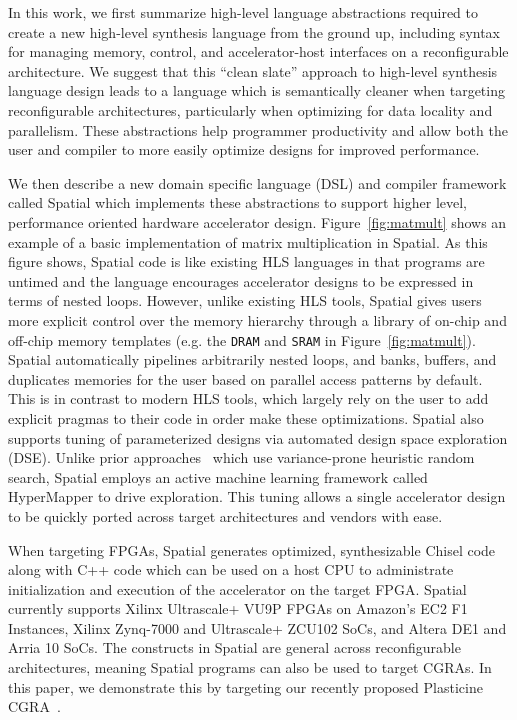 In this work, we first summarize high-level language abstractions required to create a new high-level synthesis language from the ground up, including syntax for managing memory, control, and accelerator-host interfaces on a reconfigurable architecture.
We suggest that this ``clean slate'' approach to high-level synthesis language design leads to a language which is semantically cleaner when targeting reconfigurable architectures, particularly when optimizing for data locality and parallelism.
These abstractions help programmer productivity and allow both the user and compiler to more easily optimize designs for improved performance.


We then describe a new domain specific language (DSL) and compiler framework called Spatial which implements these abstractions to support higher level, performance oriented hardware accelerator design.
Figure~\ref{fig:matmult} shows an example of a basic implementation of matrix multiplication in Spatial.
As this figure shows, Spatial code is like existing HLS languages in that programs are untimed and the language encourages accelerator designs to be expressed in terms of nested loops. However, unlike existing HLS tools, Spatial gives users more explicit control over the memory hierarchy through a library of on-chip and off-chip memory templates (e.g. the \texttt{DRAM} and \texttt{SRAM} in Figure~\ref{fig:matmult}).
Spatial automatically pipelines arbitrarily nested loops, and banks, buffers, and duplicates memories for the user based on parallel access patterns by default.
This is in contrast to modern HLS tools, which largely rely on the user to add explicit pragmas to their code in order make these optimizations.
Spatial also supports tuning of parameterized designs via automated design space exploration (DSE).
Unlike prior approaches~\cite{dhdl} which use variance-prone heuristic random search, Spatial employs an active machine learning framework called HyperMapper \cite{Bodin2016:PACT16} to drive exploration.
This tuning allows a single accelerator design to be quickly ported across target architectures and vendors with ease.

When targeting FPGAs, Spatial generates optimized, synthesizable Chisel code along with C++ code which can be used on a host CPU to administrate initialization and execution of the accelerator on the target FPGA.
Spatial currently supports Xilinx Ultrascale+ VU9P FPGAs on Amazon's EC2 F1 Instances, Xilinx Zynq-7000 and Ultrascale+ ZCU102 SoCs, and Altera DE1 and Arria 10 SoCs.
The constructs in Spatial are general across reconfigurable architectures, meaning Spatial programs can also be used to target CGRAs. In this paper, we demonstrate this by targeting our recently proposed Plasticine CGRA~\cite{plasticine}.




